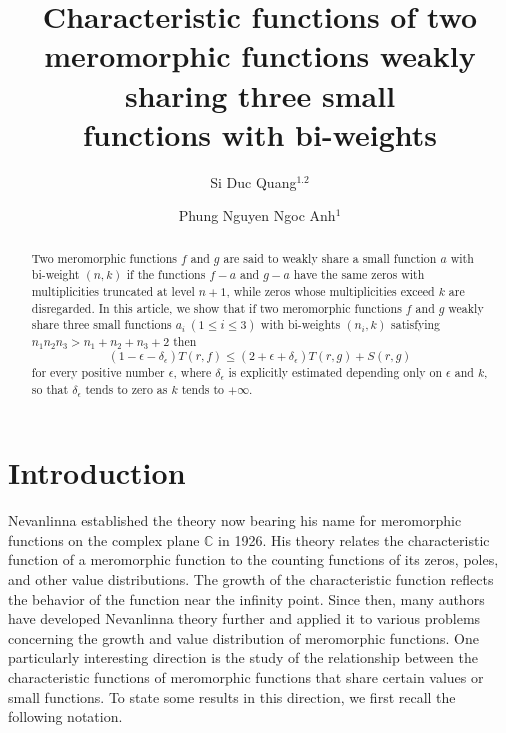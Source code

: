 \documentclass[12pt,leqno]{amsart}
\title[Characteristic functions of two meromorphic functions]{Characteristic functions of two meromorphic functions weakly sharing three small\\ functions with bi-weights}
\author{\sc Si Duc Quang$^{1.2}$}
\author{\sc Phung Nguyen Ngoc Anh$^1$}
\newcommand{\C}{{\mathbb{C}}}
\numberwithin{equation}{section}
\begin{document}
\begin{abstract} Two meromorphic functions $f$ and $g$ are said to weakly share a small function $a$ with bi-weight $(n,k)$ if the functions $f-a$ and $g-a$ have the same zeros with multiplicities truncated at level $n+1$, while zeros whose multiplicities exceed $k$ are disregarded. In this article, we show that if two meromorphic functions $f$ and $g$ weakly share three small functions $a_i\ (1\le i\le 3)$ with bi-weights $(n_i,k)$ satisfying $n_1n_2n_3>n_1+n_2+n_3+2$ then 
$$(1-\epsilon-\delta_\epsilon)T(r, f)\le (2+\epsilon +\delta_\epsilon )T(r, g)+S(r, g)$$
for every positive number $\epsilon$, where $\delta_\epsilon$ is explicitly estimated depending only on $\epsilon$ and $k$, so that $\delta_\epsilon$ tends to zero as $k$ tends to $+\infty$.
\end{abstract}
\maketitle

\def\thefootnote{\empty}

\maketitle

\section{Introduction}
Nevanlinna \cite{N} established the theory now bearing his name for meromorphic functions on the complex plane $\C$ in 1926. His theory relates the characteristic function of a meromorphic function to the counting functions of its zeros, poles, and other value distributions. The growth of the characteristic function reflects the behavior of the function near the infinity point. Since then, many authors have developed Nevanlinna theory further and applied it to various problems concerning the growth and value distribution of meromorphic functions. One particularly interesting direction is the study of the relationship between the characteristic functions of meromorphic functions that share certain values or small functions. To state some results in this direction, we first recall the following notation.
\end{document}
